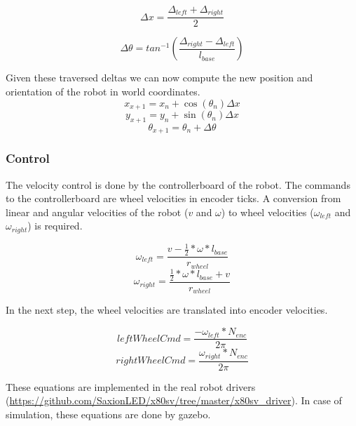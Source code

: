 \documentclass[a4paper]{article}
\begin{document}
\begin{equation}
\Delta x = \frac{\Delta_{left} + \Delta_{right}}{2}
\end{equation}

\begin{equation}
\Delta \theta = tan^{-1}(\frac{\Delta_{right} - \Delta_{left}}{l_{base}})
\end{equation}

Given these traversed deltas we can now compute the new position and orientation
of the robot in world coordinates.
\begin{equation}
 x_{x+1} = x_{n} + \cos(\theta_n) \Delta x
\end{equation}
\begin{equation}
 y_{x+1} = y_{n} + \sin(\theta_n) \Delta x
\end{equation}
\begin{equation}
 \theta_{x+1} = \theta_{n} + \Delta \theta
\end{equation}

\subsubsection{Control}

The velocity control is done by the controllerboard of the robot. The commands to
the controllerboard are wheel velocities in encoder ticks. A conversion from linear
and angular velocities of the robot ($v$ and $\omega$) to wheel velocities
($\omega_{left}$ and $\omega_{right}$) is required.

\begin{equation}
        \omega_{left} = \frac{v - \frac{1}{2} * \omega * l_{base}}{r_{wheel}}
\end{equation}
\begin{equation}
        \omega_{right} = \frac{\frac{1}{2} * \omega * l_{base} + v}{r_{wheel}}
\end{equation}

In the next step, the wheel velocities are translated into encoder velocities.

\begin{equation}
  leftWheelCmd = \frac{- \omega_{left} * N_{enc}}{2 \pi}
\end{equation}
\begin{equation}
 rightWheelCmd = \frac{\omega_{right} * N_{enc}}{2 \pi}
\end{equation}

These equations are implemented in the real robot drivers (\url{https://github.com/SaxionLED/x80sv/tree/master/x80sv_driver}). In case of simulation, these equations are done by gazebo.
\end{document}
